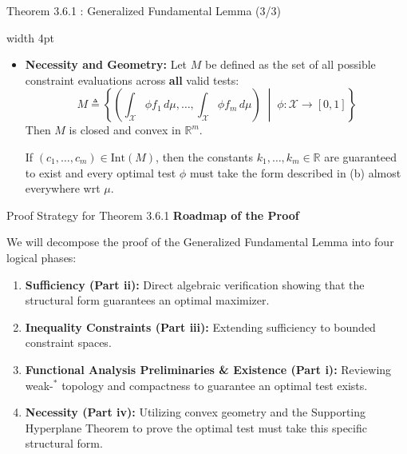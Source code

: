 \documentclass[10pt, aspectratio=169, xcolor=dvipsnames]{beamer}
\newcommand{\lead}[1]{{\color{UniBlue}\bfseries #1}}
\begin{document}
\begin{frame}{Theorem 3.6.1 : Generalized Fundamental Lemma (3/3)}
    
    \noindent
    {\color{Teal}\vrule width 4pt}%
    \hspace{10pt}%
    \begin{minipage}{\dimexpr\textwidth-14pt\relax}
        \color{Slate}
        \begin{itemize}
            \item[{\tikz[baseline=(char.base)]{\node[shape=circle,draw=Teal,inner sep=1pt,text=Teal,font=\scriptsize\bfseries] (char) {d};}}] \lead{Necessity and Geometry:} Let $M$ be defined as the set of all possible constraint evaluations across \textbf{all} valid tests:
            \[ 
            M \triangleq \left\{ \left( \int_{\mathcal{X}} \phi f_1 \, d\mu, \dots, \int_{\mathcal{X}} \phi f_m \, d\mu \right) \;\middle|\; \phi : \mathcal{X} \to [0,1] \right\} 
            \]
            Then $M$ is closed and convex in $\mathbb{R}^m$. 
            
            \vspace{0.4cm}
            If $(c_1, \dots, c_m) \in \text{Int}(M)$, then the constants $k_1, \dots, k_m \in \mathbb{R}$ are guaranteed to exist and every optimal test $\phi$ must take the form described in (b) almost everywhere wrt $\mu$.
        \end{itemize}
    \end{minipage}
\end{frame}

\begin{frame}{Proof Strategy for Theorem 3.6.1}
    \lead{Roadmap of the Proof}
    
    \vspace{0.4cm}
    We will decompose the proof of the Generalized Fundamental Lemma into four logical phases:
    
    \vspace{0.3cm}
    \begin{enumerate}
        \item \lead{Sufficiency (Part ii):} Direct algebraic verification showing that the structural form guarantees an optimal maximizer.
        \vspace{0.2cm}
        \item \lead{Inequality Constraints (Part iii):} Extending sufficiency to bounded constraint spaces.
        \vspace{0.2cm}
        \item \lead{Functional Analysis Preliminaries \& Existence (Part i):} Reviewing weak-$^\ast$ topology and compactness to guarantee an optimal test exists.
        \vspace{0.2cm}
        \item \lead{Necessity (Part iv):} Utilizing convex geometry and the Supporting Hyperplane Theorem to prove the optimal test must take this specific structural form.
    \end{enumerate}
\end{frame}
\end{document}
